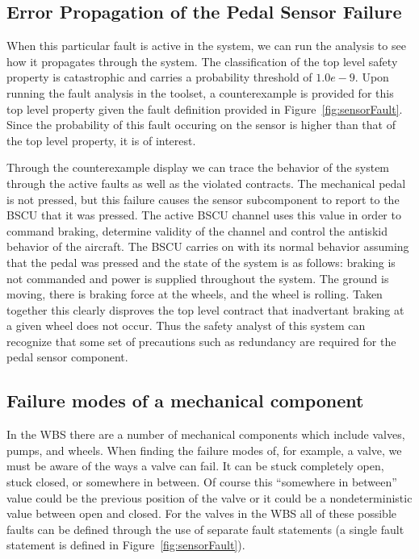 \subsection{Error Propagation of the Pedal Sensor Failure}

When this particular fault is active in the system, we can run the analysis to see how it propagates through the system. The classification of the top level safety property is catastrophic and carries a probability threshold of $1.0e-9$. Upon running the fault analysis in the toolset, a counterexample is provided for this top level property given the fault definition provided in Figure~\ref{fig:sensorFault}. Since the probability of this fault occuring on the sensor is higher than that of the top level property, it is of interest. 

Through the counterexample display we can trace the behavior of the system through the active faults as well as the violated contracts. The mechanical pedal is not pressed, but this failure causes the sensor subcomponent to report to the BSCU that it was pressed. The active BSCU channel uses this value in order to command braking, determine validity of the channel and control the antiskid behavior of the aircraft. The BSCU carries on with its normal behavior assuming that the pedal was pressed and the state of the system is as follows: braking is not commanded and power is supplied throughout the system. The ground is moving, there is braking force at the wheels, and the wheel is rolling. Taken together this clearly disproves the top level contract that inadvertant braking at a given wheel does not occur. Thus the safety analyst of this system can recognize that some set of precautions such as redundancy are required for the pedal sensor component. 

\subsection{Failure modes of a mechanical component}
In the WBS there are a number of mechanical components which include valves, pumps, and wheels. When finding the failure modes of, for example, a valve, we must be aware of the ways a valve can fail. It can be stuck completely open, stuck closed, or somewhere in between. Of course this ``somewhere in between'' value could be the previous position of the valve or it could be a nondeterministic value between open and closed. For the valves in the WBS all of these possible faults can be defined through the use of separate fault statements (a single fault statement is defined in Figure~\ref{fig:sensorFault}). 


